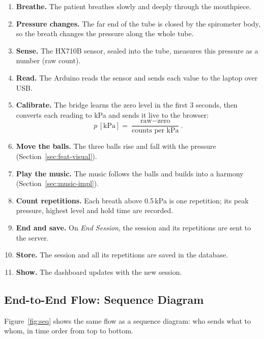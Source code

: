 \documentclass[12pt,a4paper]{article}
\begin{document}
\begin{enumerate}
  \item \textbf{Breathe.} The patient breathes slowly and deeply through the mouthpiece.
  \item \textbf{Pressure changes.} The far end of the tube is closed by the spirometer body, so the breath changes the pressure along the whole tube.
  \item \textbf{Sense.} The HX710B sensor, sealed into the tube, measures this pressure as a number (raw count).
  \item \textbf{Read.} The Arduino reads the sensor and sends each value to the laptop over USB.
  \item \textbf{Calibrate.} The bridge learns the zero level in the first 3 seconds, then converts each reading to kPa and sends it live to the browser:
  \[
    p\,[\text{kPa}] = \frac{\text{raw} - \text{zero}}{\text{counts per kPa}}.
  \]
  \item \textbf{Move the balls.} The three balls rise and fall with the pressure (Section~\ref{sec:feat-visual}).
  \item \textbf{Play the music.} The music follows the balls and builds into a harmony (Section~\ref{sec:music-impl}).
  \item \textbf{Count repetitions.} Each breath above 0.5\,kPa is one repetition; its peak pressure, highest level and hold time are recorded.
  \item \textbf{End and save.} On \emph{End Session}, the session and its repetitions are sent to the server.
  \item \textbf{Store.} The session and all its repetitions are saved in the database.
  \item \textbf{Show.} The dashboard updates with the new session.
\end{enumerate}

\subsection{End-to-End Flow: Sequence Diagram}
\label{sec:seq}

Figure~\ref{fig:seq} shows the same flow as a sequence diagram: who sends what to whom, in time order from top to bottom.
\end{document}
